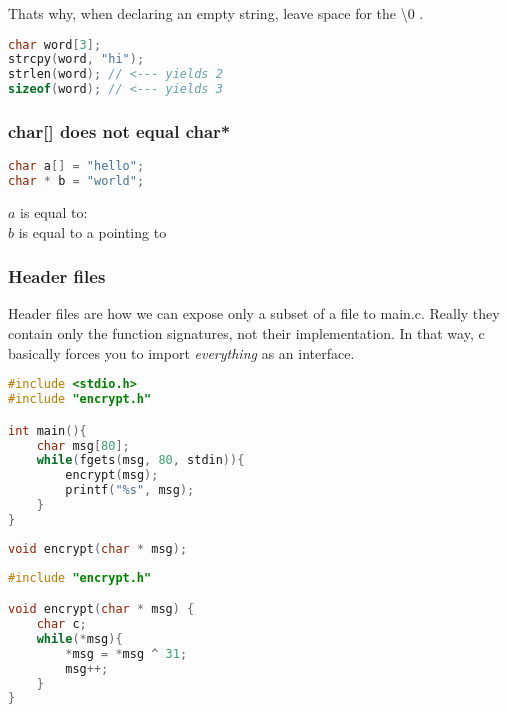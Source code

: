 Thats why, when declaring an empty string, leave space for the \textbackslash 0 .

\begin{lstlisting}[language=c]
char word[3];
strcpy(word, "hi");
strlen(word); // <--- yields 2
sizeof(word); // <--- yields 3
\end{lstlisting}


\subsubsection{char[] does not equal char*}

\begin{lstlisting}[language=c]
char a[] = "hello";
char * b = "world";
\end{lstlisting}

$a$ is equal to:       \\
$b$ is equal to a  pointing to      




\subsubsection{Header files}

Header files are how we can expose only a subset of a file to main.c. Really they contain only the function signatures, not their implementation. In that way, c basically forces you to import \emph{everything} as an interface. 


\begin{lstlisting}[language=c,caption={main.c}]
#include <stdio.h>
#include "encrypt.h"

int main(){
    char msg[80];
    while(fgets(msg, 80, stdin)){
        encrypt(msg);
        printf("%s", msg);
    }
}
\end{lstlisting}


\begin{lstlisting}[language=c,caption={encrypt.h}]
void encrypt(char * msg);
\end{lstlisting}


\begin{lstlisting}[language=c,caption={encrypt.c}]
#include "encrypt.h"

void encrypt(char * msg) {
    char c;
    while(*msg){
        *msg = *msg ^ 31;
        msg++;
    }
}
\end{lstlisting}



